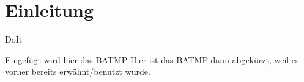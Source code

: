 \section{Einleitung}

    \glqq{}DoIt\grqq{} %


Eingefügt wird hier das \gls{BATMP} %
Hier ist das \gls{BATMP} dann abgekürzt, weil es vorher bereits erwähnt/benutzt wurde.

\clearpage